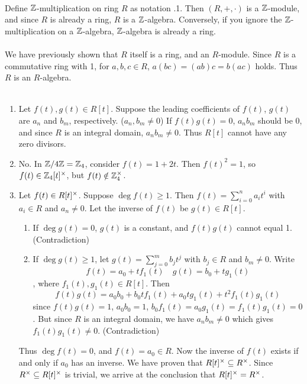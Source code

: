 \\
 Define $\mathbb{Z}$-multiplication on ring $R$ as notation {.1}. Then $(R, +, \cdot)$ is a $\mathbb{Z}$-module, and since $R$ is already a ring, $R$ is a $\mathbb{Z}$-algebra. Conversely, if you ignore the $\mathbb{Z}$-multiplication on a $\mathbb{Z}$-algebra, $\mathbb{Z}$-algebra is already a ring.\\
\\
 We have previously shown that $R$ itself is a ring, and an $R$-module. Since $R$ is a commutative ring with 1, for $a, b, c\in R$, $a(bc) = (ab)c = b(ac)$ holds. Thus $R$ is an $R$-algebra.\\
\\
\begin{enumerate}
	\item Let $f(t), g(t)\in R[t]$. Suppose the leading coefficients of $f(t)$, $g(t)$ are $a_n$ and $b_m$, respectively. ($a_n, b_m\neq 0$) If $f(t)g(t) = 0$, $a_nb_m$ should be 0, and since $R$ is an integral domain, $a_nb_m \neq 0$. Thus $R[t]$ cannot have any zero divisors.
	\item No. In $\mathbb{Z}/4\mathbb{Z} = \mathbb{Z}_4$, consider $f(t)=1+2t$. Then $f(t)^2 = 1$, so $f(t)\in \mathbb{Z}_4[t]^\times$, but $f(t)\notin \mathbb{Z}_4^\times$.
	\item Let $f(t) \in R[t]^\times$. Suppose $\deg f(t) \geq 1$. Then $f(t) = \sum_{i=0}^n a_i t^i$ with $a_i\in R$ and $a_n \neq 0$. Let the inverse of $f(t)$ be $g(t)\in R[t]$.
	\begin{enumerate}
		\item If $\deg g(t) = 0$, $g(t)$ is a constant, and $f(t)g(t)$ cannot equal 1. (Contradiction)
		\item If $\deg g(t) \geq 1$, let $g(t) = \sum_{j=0}^m b_j t^j$ with $b_j\in R$ and $b_m \neq 0$. Write 
		$$f(t) = a_0 + tf_1(t) \quad g(t) = b_0 + tg_1(t)$$
		, where $f_1(t), g_1(t)\in R[t]$. Then $$f(t)g(t) = a_0b_0 + b_0tf_1(t) + a_0tg_1(t) + t^2f_1(t)g_1(t)$$
		since $f(t)g(t) = 1$, $a_0b_0 = 1$, $b_0f_1(t) = a_0g_1(t) = f_1(t)g_1(t) = 0$. But since $R$ is an integral domain, we have $a_nb_m\neq 0$ which gives $f_1(t)g_1(t) \neq 0$. (Contradiction)
	\end{enumerate}
	Thus $\deg f(t) = 0$, and $f(t) = a_0 \in R$. Now the inverse of $f(t)$ exists if and only if $a_0$ has an inverse. We have proven that $R[t]^\times \subseteq R^\times$. Since $R^\times \subseteq R[t]^\times$ is trivial, we arrive at the conclusion that $R[t]^\times = R^\times$.
\end{enumerate}~
\\
